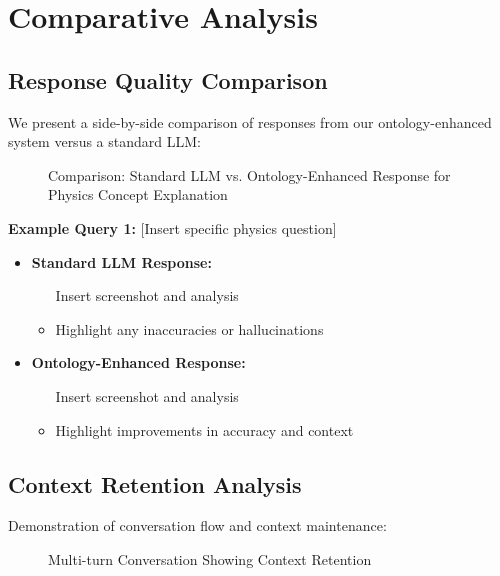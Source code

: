 \section{Comparative Analysis}
\label{sec:comparative-analysis}

\subsection{Response Quality Comparison}
\label{subsec:response-comparison}

We present a side-by-side comparison of responses from our ontology-enhanced system versus a standard LLM:

\begin{figure}[h]
    \centering
    \caption{Comparison: Standard LLM vs. Ontology-Enhanced Response for Physics Concept Explanation}
    \label{fig:response-comparison-1}
\end{figure}

\textbf{Example Query 1:} [Insert specific physics question]

\begin{itemize}
    \item \textbf{Standard LLM Response:}
    \begin{itemize}
        \item [Insert screenshot and analysis]
        \item Highlight any inaccuracies or hallucinations
    \end{itemize}
    
    \item \textbf{Ontology-Enhanced Response:}
    \begin{itemize}
        \item [Insert screenshot and analysis]
        \item Highlight improvements in accuracy and context
    \end{itemize}
\end{itemize}

\subsection{Context Retention Analysis}
\label{subsec:context-retention}

Demonstration of conversation flow and context maintenance:

\begin{figure}[h]
    \centering
    \caption{Multi-turn Conversation Showing Context Retention}
    \label{fig:context-retention}
\end{figure}

